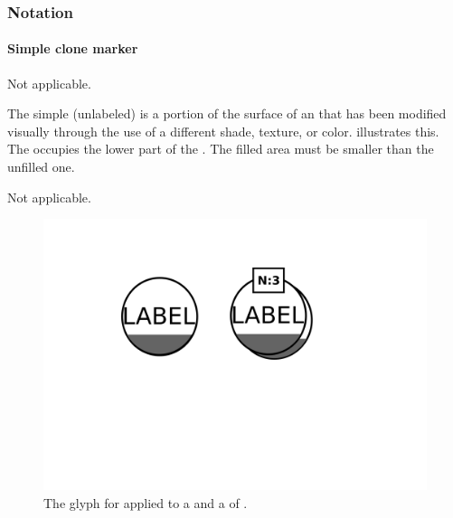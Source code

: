 \begin{valrules}
\end{valrules}


\subsubsection{Notation}

\paragraph{Simple clone marker}

\begin{glyphDescription}

\glyphSboTerm Not applicable.

\glyphContainer The simple (unlabeled)  is a
portion of the surface of an  that has been modified
visually through the use of a different shade, texture, or color.
 illustrates this.  The 
occupies the lower part of the . The filled area must be
smaller than the unfilled one.

\glyphLabel Not applicable.

\end{glyphDescription}

\begin{figure}[htb]
  \centering
  \includegraphics[scale = 0.3]{images/simpleCloneMarker}
  \caption{The \PD glyph for  applied to a  and a  of .}
  \label{fig:techref:simpleCloneMarker}
\end{figure}

